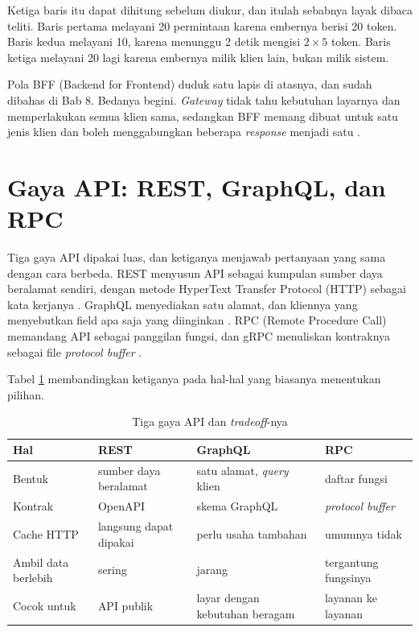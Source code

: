 Ketiga baris itu dapat dihitung sebelum diukur, dan itulah sebabnya layak
dibaca teliti. Baris pertama melayani 20 permintaan karena embernya berisi 20
token. Baris kedua melayani 10, karena menunggu 2 detik mengisi $2 \times 5$
token. Baris ketiga melayani 20 lagi karena embernya milik klien lain, bukan
milik sistem.

Pola BFF (Backend for Frontend) duduk satu lapis di atasnya, dan sudah
dibahas di Bab 8. Bedanya begini. \textit{Gateway} tidak tahu kebutuhan
layarnya dan memperlakukan semua klien sama, sedangkan BFF memang dibuat
untuk satu jenis klien dan boleh menggabungkan beberapa \textit{response} menjadi satu
\cite{newman-bff}.

\section{Gaya API: REST, GraphQL, dan RPC}

Tiga gaya API dipakai luas, dan ketiganya menjawab pertanyaan yang sama
dengan cara berbeda. REST menyusun API sebagai kumpulan sumber daya beralamat
sendiri, dengan metode HyperText Transfer Protocol (HTTP) sebagai kata kerjanya \cite{fielding2000rest}.
GraphQL menyediakan satu alamat, dan kliennya yang menyebutkan field apa saja
yang diinginkan \cite{graphql-spec}. RPC (Remote Procedure Call) memandang
API sebagai panggilan fungsi, dan gRPC menuliskan kontraknya sebagai file
\textit{protocol buffer} \cite{grpc-docs}.

Tabel \ref{tab:gaya-api} membandingkan ketiganya pada hal-hal yang biasanya
menentukan pilihan.

\begin{table}[!htb]
  \centering
  \caption{Tiga gaya API dan \textit{tradeoff}-nya}
  \label{tab:gaya-api}
  \begin{tabularx}{\textwidth}{lXXX}
    \hline
    \textbf{Hal} & \textbf{REST} & \textbf{GraphQL} & \textbf{RPC} \\
    \hline
    Bentuk & sumber daya beralamat & satu alamat, \textit{query} klien & daftar fungsi \\
    \hline
    Kontrak & OpenAPI & skema GraphQL & \textit{protocol buffer} \\
    \hline
    Cache HTTP & langsung dapat dipakai & perlu usaha tambahan & umumnya tidak \\
    \hline
    Ambil data berlebih & sering & jarang & tergantung fungsinya \\
    \hline
    Cocok untuk & API publik & layar dengan kebutuhan beragam & layanan ke layanan \\
    \hline
  \end{tabularx}
\end{table}

